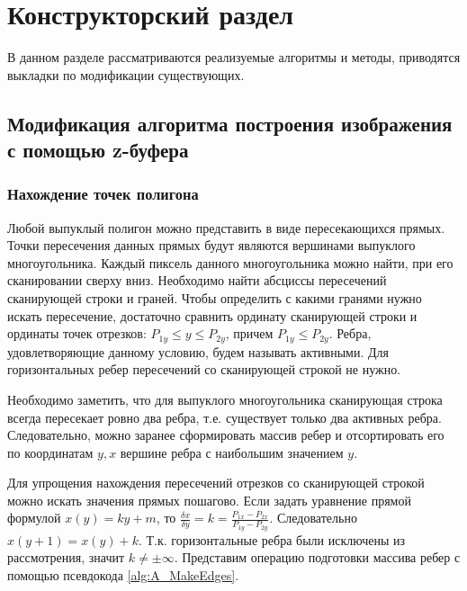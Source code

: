 \chapter{Конструкторский раздел}
\label{cha:design}

В данном разделе рассматриваются реализуемые алгоритмы и методы, приводятся выкладки по модификации существующих.

\section{Модификация алгоритма построения изображения с помощью z-буфера}

\subsection{Нахождение точек полигона}

Любой выпуклый полигон можно представить в виде пересекающихся прямых. Точки пересечения данных прямых будут являются вершинами выпуклого многоугольника. Каждый пиксель данного многоугольника можно найти, при его сканировании сверху вниз. Необходимо найти абсциссы пересечений сканирующей строки и граней. Чтобы определить с какими гранями нужно искать пересечение, достаточно сравнить ординату сканирующей строки и ординаты точек отрезков: $P_{1y} \leq y \leq P_{2y}$, причем $P_{1y} \leq P_{2y}$. Ребра, удовлетворяющие данному условию, будем называть активными. Для горизонтальных ребер пересечений со сканирующей строкой не нужно.

Необходимо заметить, что для выпуклого многоугольника сканирующая строка всегда пересекает ровно два ребра, т.е. существует только два активных ребра. Следовательно, можно заранее сформировать массив ребер и отсортировать его по координатам $y,x$ вершине ребра с наибольшим значением $y$. 

Для упрощения нахождения пересечений отрезков со сканирующей строкой можно искать значения прямых пошагово. Если задать уравнение прямой формулой $x(y) = ky + m$, то $\frac{\delta x}{\delta y} = k = \frac{P_{1x} - P_{2x}}{P_{1y} - P_{2y}}$. Следовательно $x(y + 1) = x(y) + k$. Т.к. горизонтальные ребра были исключены из рассмотрения, значит $k \neq \pm \infty$. Представим операцию подготовки массива ребер с помощью псевдокода \ref{alg:A_MakeEdges}.

